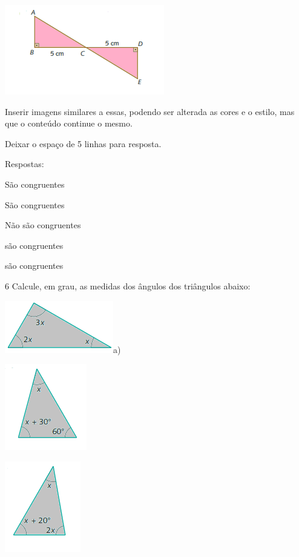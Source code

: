 \includegraphics[width=2\times 73958in,height=1\times 54167in]{./imgSAEB_8_MAT/media/image23.png}

\item 

Inserir imagens similares a essas, podendo ser alterada as cores e o
estilo, mas que o conteúdo continue o mesmo.

Deixar o espaço de 5 linhas para resposta.

Respostas:

\item São congruentes
\item São congruentes
\item Não são congruentes
\item são congruentes
\item são congruentes

\num{6} Calcule, em grau, as medidas dos ângulos dos triângulos abaixo:

\includegraphics[width=1\times 86458in,height=0\times 89583in]{./imgSAEB_8_MAT/media/image24.png}a)

\includegraphics[width=1\times 40625in,height=1\times 47917in]{./imgSAEB_8_MAT/media/image25.png}

\item 

\includegraphics[width=1\times 30208in,height=1\times 5625in]{./imgSAEB_8_MAT/media/image26.png}

